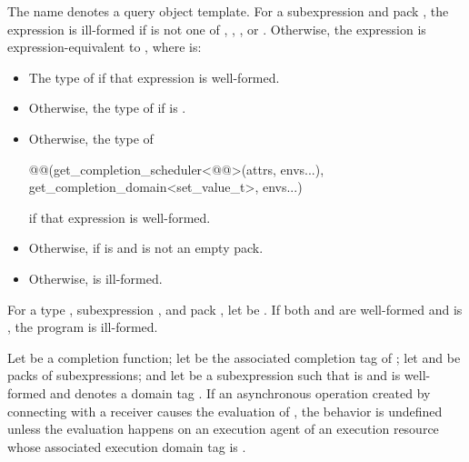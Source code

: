 \pnum
The name  denotes a query object template.
For a subexpression  and pack ,
the expression 
is ill-formed if  is not one of
,
,
, or
.
Otherwise, the expression is expression-equivalent to
,
where  is:
\begin{itemize}
\item
The type of
if that expression is well-formed.
\item
Otherwise, the type of
if  is .
\item
Otherwise, the type of
\begin{codeblock}
@@(get_completion_scheduler<@@>(attrs, envs...),
          get_completion_domain<set_value_t>, envs...)
\end{codeblock}
if that expression is well-formed.
\item
Otherwise,  if
 is  and
 is not an empty pack.
\item
Otherwise, 
is ill-formed.
\end{itemize}

\pnum
For a type , subexpression , and pack ,
let  be
.
If both  and
 are well-formed and
 is ,
the program is ill-formed.

\pnum
Let  be a completion function;
let  be the associated completion tag of ;
let  and  be packs of subexpressions; and
let  be a subexpression such that
 is  and
is well-formed and denotes a domain tag .
If an asynchronous operation created by connecting
 with a receiver 
causes the evaluation of ,
the behavior is undefined
unless the evaluation happens on an execution agent of an execution resource
whose associated execution domain tag is .

